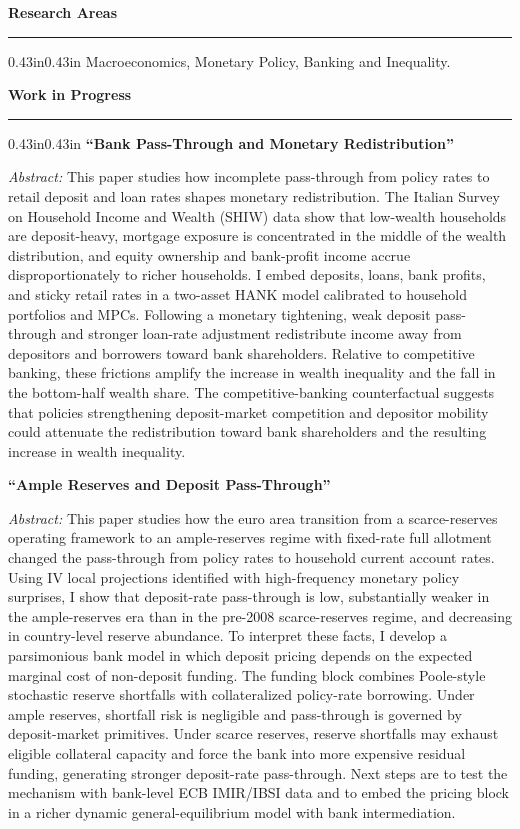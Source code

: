\documentclass[10pt,a4paper]{article}
\newenvironment{cvbody}
  {\begin{adjustwidth}{0.43in}{0.43in}}
  {\end{adjustwidth}}
\newcommand{\cvsection}[1]{%
  \vspace{9pt}%
  {\large\bfseries #1}\par
  \vspace{3pt}\hrule\vspace{5pt}%
}
\newcommand{\paper}[3]{%
  \textbf{``#1''}#2\par
  \vspace{3pt}
  {\fontsize{8.3}{9.6}\selectfont\textit{Abstract:} #3\par}
  \vspace{6pt}
}
\begin{document}
\cvsection{Research Areas}
\vspace{4pt}
\begin{cvbody}
  Macroeconomics, Monetary Policy, Banking and Inequality.
\end{cvbody}

\cvsection{Work in Progress}
\vspace{4pt}

\begin{cvbody}
  \paper{Bank Pass-Through and Monetary Redistribution}{}{This paper studies how incomplete pass-through from policy rates to retail deposit and loan rates shapes monetary redistribution. The Italian Survey on Household Income and Wealth (SHIW) data show that low-wealth households are deposit-heavy, mortgage exposure is concentrated in the middle of the wealth distribution, and equity ownership and bank-profit income accrue disproportionately to richer households. I embed deposits, loans, bank profits, and sticky retail rates in a two-asset HANK model calibrated to household portfolios and MPCs. Following a monetary tightening, weak deposit pass-through and stronger loan-rate adjustment redistribute income away from depositors and borrowers toward bank shareholders. Relative to competitive banking, these frictions amplify the increase in wealth inequality and the fall in the bottom-half wealth share. The competitive-banking counterfactual suggests that policies strengthening deposit-market competition and depositor mobility could attenuate the redistribution toward bank shareholders and the resulting increase in wealth inequality.}

\vspace{4pt}

  \paper{Ample Reserves and Deposit Pass-Through}{}{This paper studies how the euro area transition from a scarce-reserves operating framework to an ample-reserves regime with fixed-rate full allotment changed the pass-through from policy rates to household current account rates. Using IV local projections identified with high-frequency monetary policy surprises, I show that deposit-rate pass-through is low, substantially weaker in the ample-reserves era than in the pre-2008 scarce-reserves regime, and decreasing in country-level reserve abundance. To interpret these facts, I develop a parsimonious bank model in which deposit pricing depends on the expected marginal cost of non-deposit funding. The funding block combines Poole-style stochastic reserve shortfalls with collateralized policy-rate borrowing. Under ample reserves, shortfall risk is negligible and pass-through is governed by deposit-market primitives. Under scarce reserves, reserve shortfalls may exhaust eligible collateral capacity and force the bank into more expensive residual funding, generating stronger deposit-rate pass-through. Next steps are to test the mechanism with bank-level ECB IMIR/IBSI data and to embed the pricing block in a richer dynamic general-equilibrium model with bank intermediation.}    


\end{cvbody}
\end{document}
